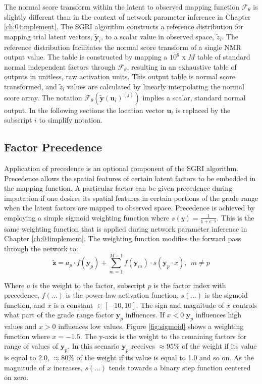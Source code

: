 The normal score transform within the latent to observed mapping function $\mathcal{F}_{\theta}$ is slightly different than in the context of network parameter inference in Chapter \ref{ch:04implement}. The \gls{SGRI} algorithm constructs a reference distribution for mapping trial latent vectors, $\tilde{\mathbf{y}}_{i}$,  to a scalar value in observed space, $\tilde{z}_{i}$. The reference distribution facilitates the normal score transform of a single NMR output value. The table is constructed by mapping a $10^{6}$ x $M$ table of standard normal independent factors through  $\mathcal{F}_{\theta}$, resulting in an exhaustive table of outputs in unitless, raw activation units. This output table is normal score transformed, and $\tilde{z}_{i}$ values are calculated by linearly interpolating the normal score array. The notation $\mathcal{F}_{\theta}(\tilde{\mathbf{y}}(\mathbf{u}_{i})^{(j)})$ implies a scalar, standard normal output. In the following sections the location vector $\mathbf{u}_{i}$ is replaced by the subscript $i$ to simplify notation.

\subsection{Factor Precedence}
\label{subsec:precedence}

Application of precedence is an optional component of the \gls{SGRI} algorithm. Precedence allows the spatial features of certain latent factors to be embedded in the mapping function. A particular factor can be given precedence during imputation if one desires its spatial features in certain portions of the grade range when the latent factors are mapped to observed space. Precedence is achieved by employing a simple sigmoid weighting function where $s(y) = \frac{1}{1+e^{-y}}$. This is the same weighting function that is applied during network parameter inference in Chapter \ref{ch:04implement}. The weighting function modifies the forward pass through the network to:
\begin{equation}
    \tilde{\mathbf{z}} = a_{p} \cdot f(\mathbf{y}_{p}) + \sum_{m=1}^{M-1} f(\mathbf{y}_{m}) \cdot s(\mathbf{y}_{p} \cdot x), \ \ m \neq p
    \label{eq:wtpass}
\end{equation}

Where $a$ is the weight to the factor, subscript $p$ is the factor index with precedence, $f(\dots)$ is the power law activation function, $s(\dots)$ is the sigmoid function, and $x$ is a constant $\in [-10, 10]$. The sign and magnitude of $x$ controls what part of the grade range factor $\mathbf{y}_{p}$ influences. If $x<0$ $\mathbf{y}_{p}$ influences high values and $x>0$ influences low values. Figure \ref{fig:sigmoid} shows a weighting function where $x=-1.5$. The y-axis is the weight to the remaining factors for range of values of $\mathbf{y}_{p}$. In this scenario $\mathbf{y}_{p}$ receives $\approx 95\%$ of the weight if its value is equal to 2.0, $\approx 80\%$ of the weight if its value is equal to 1.0 and so on. As the magnitude of $x$ increases, $s(\dots)$ tends towards a binary step function centered on zero.

